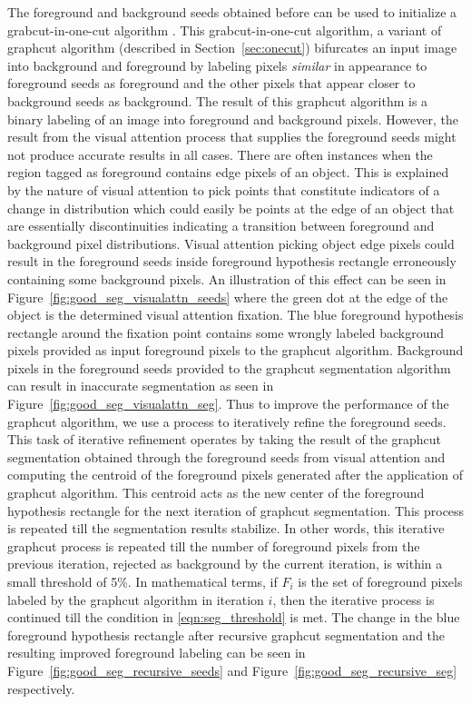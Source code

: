 \documentclass {udthesis}
\begin{document}
The foreground and background seeds obtained before can be used to initialize a grabcut-in-one-cut algorithm \cite{onecut}. This grabcut-in-one-cut algorithm, a variant of graphcut algorithm (described in Section~\ref{sec:onecut}) bifurcates an input image into background and foreground by labeling pixels \textit{similar} in appearance to foreground seeds as foreground and the other pixels that appear closer to background seeds as background. The result of this graphcut algorithm is a binary labeling of an image into foreground and background pixels. 
However, the result from the visual attention process that supplies the foreground seeds might not produce accurate results in all cases. There are often instances when the region tagged as foreground contains edge pixels of an object. This is explained by the nature of visual attention to pick points that constitute indicators of a change in distribution which could easily be points at the edge of an object that are essentially discontinuities indicating a transition between foreground and background pixel distributions. Visual attention picking object edge pixels could result in the foreground seeds inside foreground hypothesis rectangle erroneously containing some background pixels. An illustration of this effect can be seen in Figure~\ref{fig:good_seg_visualattn_seeds} where the green dot at the edge of the object is the determined visual attention fixation. The blue foreground hypothesis rectangle around the fixation point contains some wrongly labeled background pixels provided as input foreground 
pixels to the graphcut algorithm. Background pixels in the foreground seeds provided to the graphcut segmentation algorithm can result in inaccurate segmentation as seen in Figure~\ref{fig:good_seg_visualattn_seg}. Thus to improve the performance of the graphcut algorithm, we use a process to iteratively refine the foreground seeds. This task of iterative refinement operates by taking the result of the graphcut segmentation obtained through the foreground seeds from visual attention and computing the centroid of the foreground pixels generated after the application of graphcut algorithm. This centroid acts as the new center of the foreground hypothesis rectangle for the next iteration of graphcut segmentation. This process is repeated till the segmentation results stabilize. In other words, this iterative graphcut process is repeated 
till the number of foreground pixels from the previous iteration, rejected as background by the current iteration, is within a small threshold of 5\%. In mathematical terms, if $F_i$ is the set of foreground pixels labeled by the graphcut algorithm in iteration $i$, then the iterative process is continued till the condition in \eqref{eqn:seg_threshold} is met. The change in the blue foreground hypothesis rectangle after recursive graphcut segmentation and the resulting improved foreground labeling can be seen in Figure~\ref{fig:good_seg_recursive_seeds} and Figure~\ref{fig:good_seg_recursive_seg} respectively.
\end{document}
